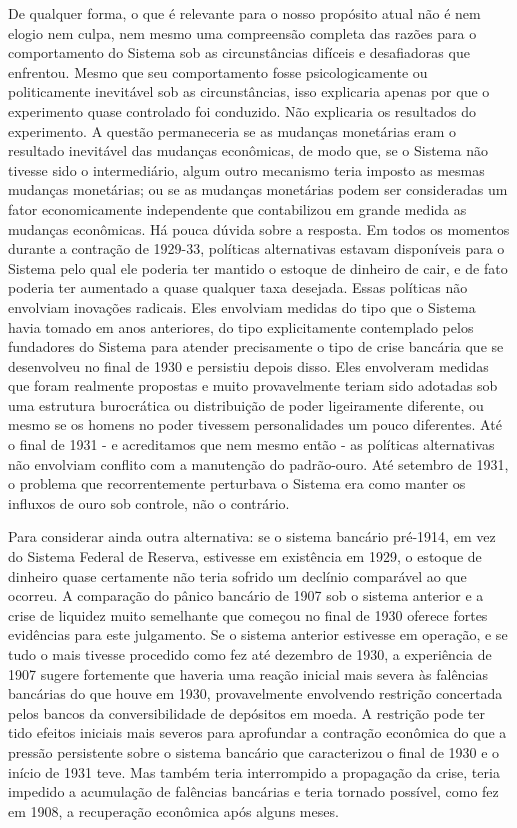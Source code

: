 \documentclass[a4paper,12pt]{article}[abntex2]
\begin{document}
De qualquer forma, o que é relevante para o nosso propósito atual não é nem elogio nem culpa, nem mesmo uma compreensão completa das razões para o comportamento do Sistema sob as circunstâncias difíceis e desafiadoras que enfrentou. Mesmo que seu comportamento fosse psicologicamente ou politicamente inevitável sob as circunstâncias, isso explicaria apenas por que o experimento quase controlado foi conduzido. Não explicaria os resultados do experimento. A questão permaneceria se as mudanças monetárias eram o resultado inevitável das mudanças econômicas, de modo que, se o Sistema não tivesse sido o intermediário, algum outro mecanismo teria imposto as mesmas mudanças monetárias; ou se as mudanças monetárias podem ser consideradas um fator economicamente independente que contabilizou em grande medida as mudanças econômicas. Há pouca dúvida sobre a resposta. Em todos os momentos durante a contração de 1929-33, políticas alternativas estavam disponíveis para o Sistema pelo qual ele poderia ter mantido o estoque de dinheiro de cair, e de fato poderia ter aumentado a quase qualquer taxa desejada. Essas políticas não envolviam inovações radicais. Eles envolviam medidas do tipo que o Sistema havia tomado em anos anteriores, do tipo explicitamente contemplado pelos fundadores do Sistema para atender precisamente o tipo de crise bancária que se desenvolveu no final de 1930 e persistiu depois disso. Eles envolveram medidas que foram realmente propostas e muito provavelmente teriam sido adotadas sob uma estrutura burocrática ou distribuição de poder ligeiramente diferente, ou mesmo se os homens no poder tivessem personalidades um pouco diferentes. Até o final de 1931 - e acreditamos que nem mesmo então - as políticas alternativas não envolviam conflito com a manutenção do padrão-ouro. Até setembro de 1931, o problema que recorrentemente perturbava o Sistema era como manter os influxos de ouro sob controle, não o contrário.

Para considerar ainda outra alternativa: se o sistema bancário pré-1914, em vez do Sistema Federal de Reserva, estivesse em existência em 1929, o estoque de dinheiro quase certamente não teria sofrido um declínio comparável ao que ocorreu. A comparação do pânico bancário de 1907 sob o sistema anterior e a crise de liquidez muito semelhante que começou no final de 1930 oferece fortes evidências para este julgamento. Se o sistema anterior estivesse em operação, e se tudo o mais tivesse procedido como fez até dezembro de 1930, a experiência de 1907 sugere fortemente que haveria uma reação inicial mais severa às falências bancárias do que houve em 1930, provavelmente envolvendo restrição concertada pelos bancos da conversibilidade de depósitos em moeda. A restrição pode ter tido efeitos iniciais mais severos para aprofundar a contração econômica do que a pressão persistente sobre o sistema bancário que caracterizou o final de 1930 e o início de 1931 teve. Mas também teria interrompido a propagação da crise, teria impedido a acumulação de falências bancárias e teria tornado possível, como fez em 1908, a recuperação econômica após alguns meses.
\end{document}
